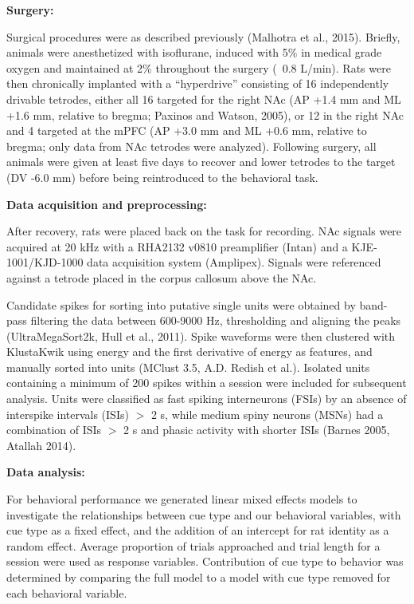 \documentclass[11pt]{article}
\begin{document}
\begin{figure}[h]
\label{fig:task}
\end{figure}

{\bf Surgery:}

Surgical procedures were as described previously (Malhotra et al., 2015). Briefly, animals were anesthetized with isoflurane, induced with 5\% in medical grade oxygen and maintained at 2\% throughout the surgery (~0.8 L/min). Rats were then chronically implanted with a “hyperdrive” consisting of 16 independently drivable tetrodes, either all 16 targeted for the right NAc (AP +1.4 mm and ML +1.6 mm, relative to bregma; Paxinos and Watson, 2005), or 12 in the right NAc and 4 targeted at the mPFC (AP +3.0 mm and ML +0.6 mm, relative to bregma; only data from NAc tetrodes were analyzed). Following surgery, all animals were given at least five days to recover and lower tetrodes to the target (DV -6.0 mm) before being reintroduced to the behavioral task.

{\bf Data acquisition and preprocessing:}

After recovery, rats were placed back on the task for recording. NAc signals were acquired at 20 kHz with a RHA2132 v0810 preamplifier (Intan) and a KJE-1001/KJD-1000 data acquisition system (Amplipex). Signals were referenced against a tetrode placed in the corpus callosum above the NAc.

Candidate spikes for sorting into putative single units were obtained by band-pass filtering the data between 600-9000 Hz, thresholding and aligning the peaks (UltraMegaSort2k, Hull et al., 2011). Spike waveforms were then clustered with KlustaKwik using energy and the first derivative of energy as features, and manually sorted into units (MClust 3.5, A.D. Redish et al.). Isolated units containing a minimum of 200 spikes within a session were included for subsequent analysis. Units were classified as fast spiking interneurons (FSIs) by an absence of interspike intervals (ISIs) $>$ 2 s, while medium spiny neurons (MSNs) had a combination of ISIs $>$ 2 s and phasic activity with shorter ISIs (Barnes 2005, Atallah 2014).

{\bf Data analysis:}

For behavioral performance we generated linear mixed effects models to investigate the relationships between cue type and our behavioral variables, with cue type as a fixed effect, and the addition of an intercept for rat identity as a random effect. Average proportion of trials approached and trial length for a session were used as response variables. Contribution of cue type to behavior was determined by comparing the full model to a model with cue type removed for each behavioral variable.
\end{document}
